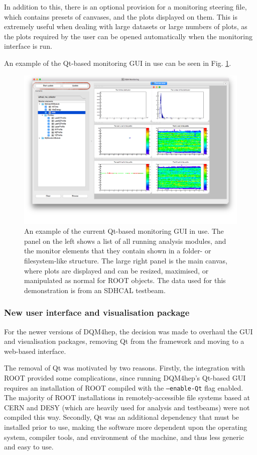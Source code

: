 In addition to this, there is an optional provision for a monitoring steering file, which contains presets of canvases, and the plots displayed on them. This is extremely useful when dealing with large datasets or large numbers of plots, as the plots required by the user can be opened automatically when the monitoring interface is run.

An example of the Qt-based monitoring \acrshort{GUI} in use can be seen in Fig. \ref{figure:daq/dqm4hep/old-gui}. 

\begin{figure}[h]
	\centering
	\includegraphics[width=1.0\textwidth]{../Pictures/DQM4hepMonitoringGui.png}
	\caption{An example of the current Qt-based monitoring \acrshort{GUI} in use. The panel on the left shows a list of all running analysis modules, and the monitor elements that they contain shown in a folder- or filesystem-like structure. The large right panel is the main canvas, where plots are displayed and can be resized, maximised, or manipulated as normal for ROOT objects. The data used for this demonstration is from an \acrshort{SDHCAL} testbeam.}
	\label{figure:daq/dqm4hep/old-gui}
\end{figure}

\subsubsection{New user interface and visualisation package}
For the newer versions of \acrshort{DQM4hep}, the decision was made to overhaul the \acrshort{GUI} and visualisation packages, removing Qt from the framework and moving to a web-based interface.

The removal of Qt was motivated by two reasons. Firstly, the integration with ROOT provided some complications, since running \acrshort{DQM4hep}'s Qt-based \acrshort{GUI} requires an installation of ROOT compiled with the \texttt{--enable-Qt} flag enabled. The majority of ROOT installations in remotely-accessible file systems based at \acrshort{CERN} and \acrshort{DESY} (which are heavily used for analysis and testbeams) were not compiled this way. Secondly, Qt was an additional dependency that must be installed prior to use, making the software more dependent upon the operating system, compiler tools, and environment of the machine, and thus less generic and easy to use.

